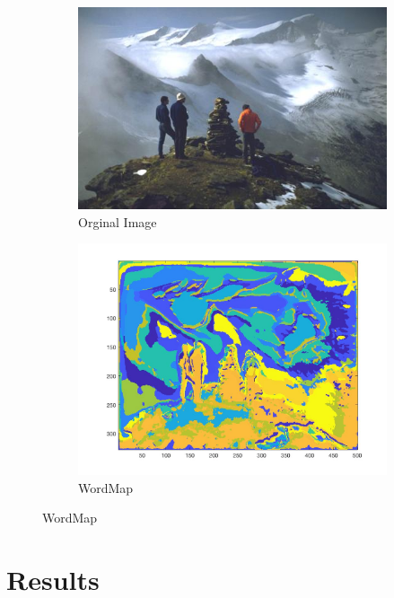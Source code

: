 \documentclass[a4paper,11pt]{article}
\begin{document}
\begin{figure}
	\centering
	\begin{subfigure}{.5\textwidth}
		\centering
		\includegraphics[width=\textwidth]{release/matlab/fig6}
		\caption{Orginal Image}
		\label{fig:sub1}
	\end{subfigure}%
	\begin{subfigure}{.5\textwidth}
		\centering
		\includegraphics[width=\textwidth]{release/matlab/WordMap6}
		\caption{WordMap}
		\label{fig:sub2}
	\end{subfigure}
\end{figure}


\section*{Results}
\end{document}
